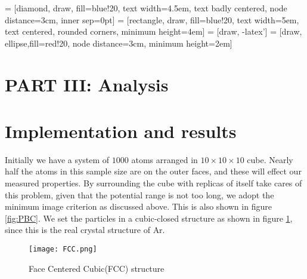 \documentclass[a4paper]{article}
\begin{document}
\begin{center}

 = [diamond, draw, fill=blue!20, 
    text width=4.5em, text badly centered, node distance=3cm, inner sep=0pt]
 = [rectangle, draw, fill=blue!20, 
    text width=5em, text centered, rounded corners, minimum height=4em]
 = [draw, -latex']
 = [draw, ellipse,fill=red!20, node distance=3cm,
    minimum height=2em]
 
\end{center}  



\section*{PART III: Analysis}
\section{Implementation and results}
Initially we have a system of $1000$ atoms arranged in $10 \times 10 \times 10$ cube. Nearly half the atoms in this sample size are on the outer faces, and these will effect our measured properties. By surrounding the cube with replicas of itself take cares of this problem, given that the potential range is not too long, we adopt the minimum image criterion as discussed above. This is also shown in figure \ref{fig:PBC}.
We set the particles in a cubic-closed structure as shown in figure \ref{fig:FCC}, since this is the real crystal structure of Ar.
\begin{figure}[!h]
\centering
\texttt{[image: FCC.png]}
\caption{\label{fig:FCC}Face Centered Cubic(FCC) structure}
\end{figure}
\end{document}
